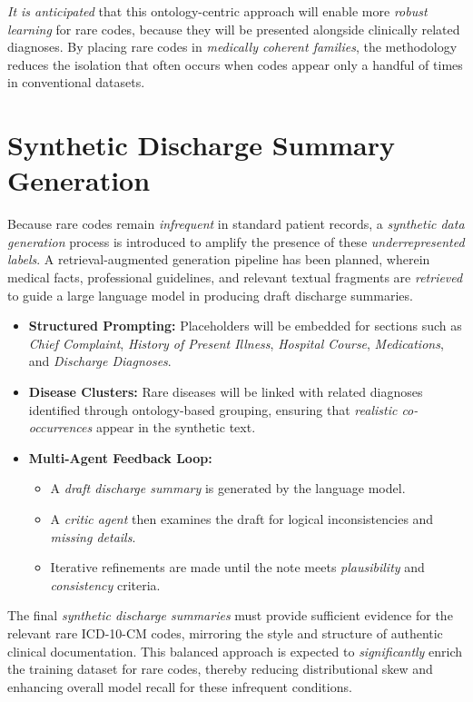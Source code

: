 \emph{It is anticipated} that this ontology-centric approach will enable more \emph{robust learning} for rare codes, because they will be presented alongside clinically related diagnoses. By placing rare codes in \emph{medically coherent families}, the methodology reduces the isolation that often occurs when codes appear only a handful of times in conventional datasets.

\section{Synthetic Discharge Summary Generation}
Because rare codes remain \emph{infrequent} in standard patient records, a \emph{synthetic data generation} process is introduced to amplify the presence of these \emph{underrepresented labels}. A retrieval-augmented generation pipeline has been planned, wherein medical facts, professional guidelines, and relevant textual fragments are \emph{retrieved} to guide a large language model in producing draft discharge summaries.

\begin{itemize}
    \item \textbf{Structured Prompting:} Placeholders will be embedded for sections such as \emph{Chief Complaint}, \emph{History of Present Illness}, \emph{Hospital Course}, \emph{Medications}, and \emph{Discharge Diagnoses}.
    \item \textbf{Disease Clusters:} Rare diseases will be linked with related diagnoses identified through ontology-based grouping, ensuring that \emph{realistic co-occurrences} appear in the synthetic text.
    \item \textbf{Multi-Agent Feedback Loop:}
    \begin{itemize}
        \item A \emph{draft discharge summary} is generated by the language model.
        \item A \emph{critic agent} then examines the draft for logical inconsistencies and \emph{missing details}.
        \item Iterative refinements are made until the note meets \emph{plausibility} and \emph{consistency} criteria.
    \end{itemize}
\end{itemize}

The final \emph{synthetic discharge summaries} must provide sufficient evidence for the relevant rare ICD-10-CM codes, mirroring the style and structure of authentic clinical documentation. This balanced approach is expected to \emph{significantly} enrich the training dataset for rare codes, thereby reducing distributional skew and enhancing overall model recall for these infrequent conditions.

